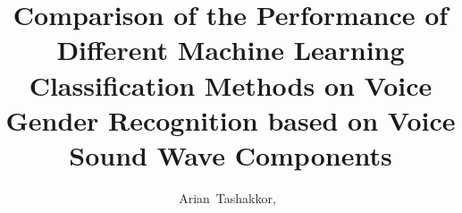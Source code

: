 \documentclass[journal,onecolumn]{IEEEtran}
\begin{document}
%
\title{Comparison of the Performance of Different Machine Learning Classification Methods on Voice Gender Recognition based on Voice Sound Wave Components}
%
%
%

\author{Arian~Tashakkor,~}

% 
%



% 
\end{document}
